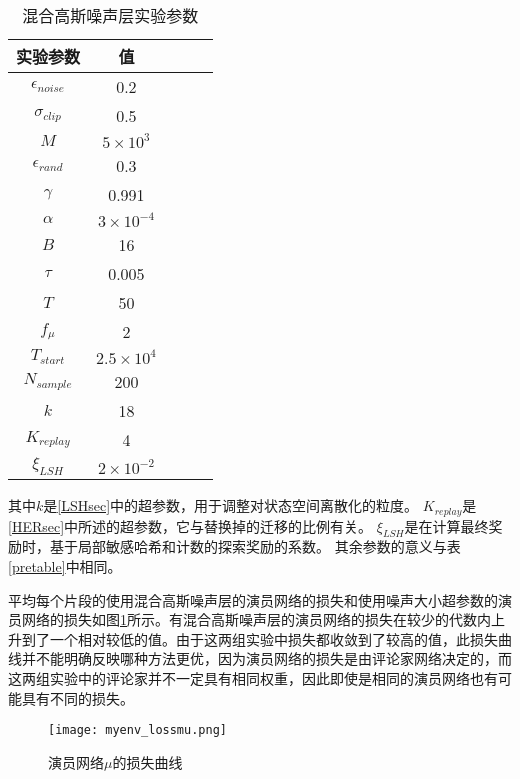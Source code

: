     \begin{table}[htbp]
        \caption{混合高斯噪声层实验参数}
        \label{fcntable}
    \vspace{0.5em}\centering\wuhao
    \begin{tabular}{ccccc}
    \toprule[1.5pt]
    实验参数 & 值\\
    \midrule[1pt]
        $\epsilon_{noise}$ & 0.2\\
        $\sigma_{clip}$ & 0.5\\
        $M$ & $5\times 10^3$\\
        $\epsilon_{rand}$ & 0.3\\
        $\gamma$ & 0.991\\
        $\alpha$ & $3\times 10^{-4}$\\
        $B$ & 16\\
        $\tau$ & 0.005\\
        $T$ & 50\\
        $f_\mu$ & 2\\
        $T_{start}$ & $2.5\times 10^4$\\
        $N_{sample}$ & 200 \\
        $k$ & 18\\
        $K_{replay}$ & 4\\
        $\xi_{LSH}$ & $2\times 10^{-2}$\\
    \bottomrule[1.5pt]
    \end{tabular}
    \end{table}
    其中$k$是\ref{LSHsec}中的超参数，用于调整对状态空间离散化的粒度。
    $K_{replay}$是\ref{HERsec}中所述的超参数，它与替换掉的迁移的比例有关。
    $\xi_{LSH}$是在计算最终奖励时，基于局部敏感哈希和计数的探索奖励的系数。
    其余参数的意义与表\ref{pretable}中相同。

    平均每个片段的使用混合高斯噪声层的演员网络的损失和使用噪声大小超参数的演员网络的损失如图\ref{fcn_lossmu}所示。有混合高斯噪声层的演员网络的损失在较少的代数内上升到了一个相对较低的值。由于这两组实验中损失都收敛到了较高的值，此损失曲线并不能明确反映哪种方法更优，因为演员网络的损失是由评论家网络决定的，而这两组实验中的评论家并不一定具有相同权重，因此即使是相同的演员网络也有可能具有不同的损失。

        \begin{figure}[htpb]
        \centering
        \texttt{[image: myenv\_lossmu.png]}
        \caption{演员网络$\mu$的损失曲线}
            \label{fcn_lossmu}
        \end{figure}

